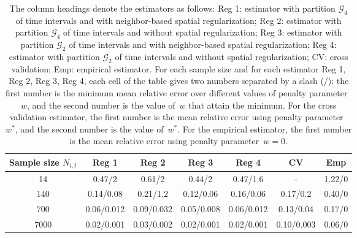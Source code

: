 \documentclass[article]{jss}
\begin{document}
\begin{table}
\centering
\begin{tabular}{|c|c|c|c|c|c|c|}
\hline
Sample size $N_{i,t}$ & Reg 1 & Reg 2 & Reg 3 & Reg 4 & CV & Emp \\
\hline
14 & 0.47/2 & 0.61/2  & 0.44/2  & 0.47/1.6  &  -  & 1.22/0  \\  
\hline
140  & 0.14/0.08  &  0.21/1.2  &  0.12/0.06 &  0.16/0.06  &  0.17/0.2  & 0.40/0\\
\hline
700 &  0.06/0.012 & 0.09/0.032  & 0.05/0.008  & 0.06/0.012  &  0.13/0.04  & 0.17/0 \\
\hline
7000 & 0.02/0.001 & 0.03/0.002 & 0.02/0.001 & 0.02/0.001 & 0.10/0.003 & 0.06/0 \\
\hline
\end{tabular}
\caption{\label{tabnoreg}
The column headings denote the estimators as follows: Reg 1: estimator with partition $\mathcal{G}_{4}$ of time intervals and with neighbor-based spatial regularization; Reg 2: estimator with partition $\mathcal{G}_{4}$ of time intervals and without spatial regularization; Reg 3: estimator with partition $\mathcal{G}_{2}$ of time intervals and with neighbor-based spatial regularization; Reg 4: estimator with partition $\mathcal{G}_{2}$ of time intervals and without spatial regularization; CV: cross validation; Emp: empirical estimator.
For each sample size and for each estimator Reg 1, Reg 2, Reg 3, Reg 4, each cell of the table gives two numbers separated by a slash (/): the first number is the minimum mean relative error over different values of penalty parameter~$w$, and the second number is the value of~$w$ that attain the minimum.
For the cross validation estimator, the first number is the mean relative error using penalty parameter~$w^*$, and the second number is the value of~$w^*$.
For the empirical estimator, the first number is the mean relative error using penalty parameter~$w = 0$.
}
\end{table}
\end{document}
